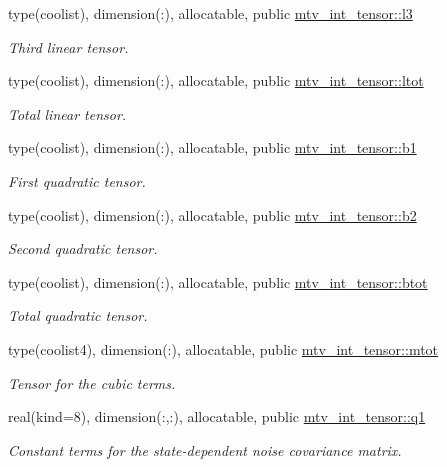\begin{DoxyCompactItemize}
type(coolist), dimension(\+:), allocatable, public \hyperlink{namespacemtv__int__tensor_a04155fe5ee1b9580674140eab208a7bc}{mtv\+\_\+int\+\_\+tensor\+::l3}
\begin{DoxyCompactList}\small\item\em Third linear tensor. \end{DoxyCompactList}\item 
type(coolist), dimension(\+:), allocatable, public \hyperlink{namespacemtv__int__tensor_ace2795d6c48885b8f847384747e8ad5d}{mtv\+\_\+int\+\_\+tensor\+::ltot}
\begin{DoxyCompactList}\small\item\em Total linear tensor. \end{DoxyCompactList}\item 
type(coolist), dimension(\+:), allocatable, public \hyperlink{namespacemtv__int__tensor_a0220ca0d7f49bf405e6848492ec24995}{mtv\+\_\+int\+\_\+tensor\+::b1}
\begin{DoxyCompactList}\small\item\em First quadratic tensor. \end{DoxyCompactList}\item 
type(coolist), dimension(\+:), allocatable, public \hyperlink{namespacemtv__int__tensor_a71cc55d84fa25e49c9886d5ac9fc5032}{mtv\+\_\+int\+\_\+tensor\+::b2}
\begin{DoxyCompactList}\small\item\em Second quadratic tensor. \end{DoxyCompactList}\item 
type(coolist), dimension(\+:), allocatable, public \hyperlink{namespacemtv__int__tensor_a888f93868eeb459582a5acc909a33374}{mtv\+\_\+int\+\_\+tensor\+::btot}
\begin{DoxyCompactList}\small\item\em Total quadratic tensor. \end{DoxyCompactList}\item 
type(coolist4), dimension(\+:), allocatable, public \hyperlink{namespacemtv__int__tensor_a3722af69dcc509f4e7d24f898a7e68ae}{mtv\+\_\+int\+\_\+tensor\+::mtot}
\begin{DoxyCompactList}\small\item\em Tensor for the cubic terms. \end{DoxyCompactList}\item 
real(kind=8), dimension(\+:,\+:), allocatable, public \hyperlink{namespacemtv__int__tensor_a2677249c594dbc196d1554e751257d1c}{mtv\+\_\+int\+\_\+tensor\+::q1}
\begin{DoxyCompactList}\small\item\em Constant terms for the state-\/dependent noise covariance matrix. \end{DoxyCompactList}\item 

\end{DoxyCompactItemize}
